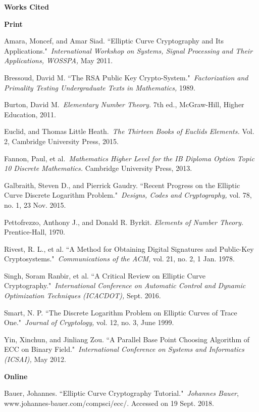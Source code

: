 \documentclass[a4paper,12pt]{article}
\theoremstyle{definition}
\begin{document}
\cleardoublepage
\textbf{\Large Works Cited}
\begin{flushleft}
\sloppy
\textbf{\large Print}

Amara, Moncef, and Amar Siad. ``Elliptic Curve Cryptography and Its Applications." \textit{International Workshop on Systems, Signal Processing and Their Applications, WOSSPA,} May 2011.

Bressoud, David M. ``The RSA Public Key Crypto-System." \textit{Factorization and Primality Testing Undergraduate Texts in Mathematics,} 1989.

Burton, David M. \textit{Elementary Number Theory.} 7th ed., McGraw-Hill, Higher Education, 2011.

Euclid, and Thomas Little Heath. \textit{The Thirteen Books of Euclids Elements.} Vol. 2, Cambridge University Press, 2015.

Fannon, Paul, et al. \textit{Mathematics Higher Level for the IB Diploma Option Topic 10 Discrete Mathematics.} Cambridge University Press, 2013.

Galbraith, Steven D., and Pierrick Gaudry. ``Recent Progress on the Elliptic Curve Discrete Logarithm Problem." \textit{Designs, Codes and Cryptography,} vol. 78, no. 1, 23 Nov. 2015.

Pettofrezzo, Anthony J., and Donald R. Byrkit.\textit{ Elements of Number Theory.} Prentice-Hall, 1970.

Rivest, R. L., et al. ``A Method for Obtaining Digital Signatures and Public-Key Cryptosystems." \textit{Communications of the ACM,} vol. 21, no. 2, 1 Jan. 1978.

Singh, Soram Ranbir, et al. ``A Critical Review on Elliptic Curve Cryptography." \textit{International Conference on Automatic Control and Dynamic Optimization Techniques (ICACDOT),} Sept. 2016.

Smart, N. P. ``The Discrete Logarithm Problem on Elliptic Curves of Trace One." \textit{Journal of Cryptology,} vol. 12, no. 3, June 1999.

Yin, Xinchun, and Jinliang Zou. ``A Parallel Base Point Choosing Algorithm of ECC on Binary Field." \textit{International Conference on Systems and Informatics (ICSAI),} May 2012.
\newline

\textbf{\large Online}

Bauer, Johannes. ``Elliptic Curve Cryptography Tutorial." \textit{Johannes Bauer}, www.johannes-bauer.com/compsci/ecc/. Accessed on 19 Sept. 2018.


\end{flushleft}
\end{document}

